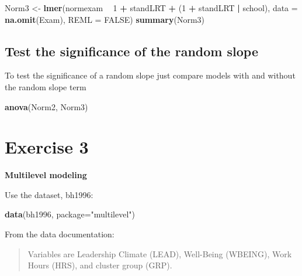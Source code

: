 \documentclass[]{book}
\newenvironment{Shaded}{\begin{snugshade}}{\end{snugshade}}
\newcommand{\KeywordTok}[1]{\textcolor[rgb]{0.13,0.29,0.53}{\textbf{#1}}}
\newcommand{\DataTypeTok}[1]{\textcolor[rgb]{0.13,0.29,0.53}{#1}}
\newcommand{\DecValTok}[1]{\textcolor[rgb]{0.00,0.00,0.81}{#1}}
\newcommand{\StringTok}[1]{\textcolor[rgb]{0.31,0.60,0.02}{#1}}
\newcommand{\OtherTok}[1]{\textcolor[rgb]{0.56,0.35,0.01}{#1}}
\newcommand{\OperatorTok}[1]{\textcolor[rgb]{0.81,0.36,0.00}{\textbf{#1}}}
\newcommand{\NormalTok}[1]{#1}
\begin{document}
\begin{Shaded}
\begin{Highlighting}[]
\NormalTok{  Norm3 <-}\StringTok{ }\KeywordTok{lmer}\NormalTok{(normexam }\OperatorTok{~}\StringTok{ }\DecValTok{1} \OperatorTok{+}\StringTok{ }\NormalTok{standLRT }\OperatorTok{+}\StringTok{ }\NormalTok{(}\DecValTok{1} \OperatorTok{+}\StringTok{ }\NormalTok{standLRT }\OperatorTok{|}\StringTok{ }\NormalTok{school), }
                \DataTypeTok{data =} \KeywordTok{na.omit}\NormalTok{(Exam), }\DataTypeTok{REML =} \OtherTok{FALSE}\NormalTok{) }
  \KeywordTok{summary}\NormalTok{(Norm3) }
\end{Highlighting}
\end{Shaded}

\subsection{Test the significance of the random
slope}\label{test-the-significance-of-the-random-slope}

To test the significance of a random slope just compare models with and
without the random slope term

\begin{Shaded}
\begin{Highlighting}[]
  \KeywordTok{anova}\NormalTok{(Norm2, Norm3) }
\end{Highlighting}
\end{Shaded}

\section{Exercise 3}\label{exercise-3-1}

\textbf{Multilevel modeling}

Use the dataset, bh1996:

\begin{Shaded}
\begin{Highlighting}[]
\KeywordTok{data}\NormalTok{(bh1996, }\DataTypeTok{package=}\StringTok{"multilevel"}\NormalTok{)}
\end{Highlighting}
\end{Shaded}

From the data documentation:

\begin{quote}
Variables are Leadership Climate (LEAD), Well-Being (WBEING), Work Hours
(HRS), and cluster group (GRP).
\end{quote}
\end{document}
